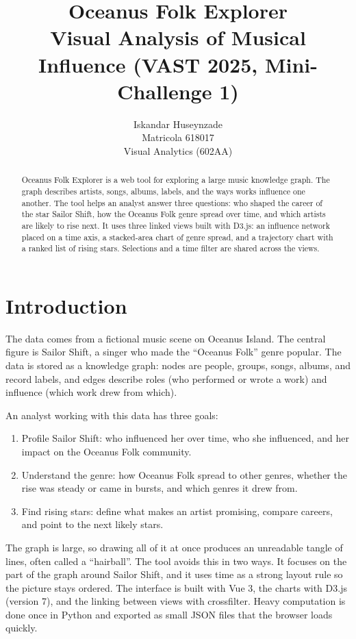 \documentclass[11pt]{article}
\title{\textbf{Oceanus Folk Explorer}\\[2pt]
\large Visual Analysis of Musical Influence (VAST 2025, Mini-Challenge 1)}
\author{Iskandar Huseynzade\\\small Matricola 618017 \\ \small Visual Analytics (602AA)}
\date{}
\begin{document}
\maketitle

\begin{abstract}
\noindent Oceanus Folk Explorer is a web tool for exploring a large music knowledge graph.
The graph describes artists, songs, albums, labels, and the ways works influence one
another. The tool helps an analyst answer three questions: who shaped the career of the
star Sailor Shift, how the Oceanus Folk genre spread over time, and which artists are
likely to rise next. It uses three linked views built with D3.js: an influence network
placed on a time axis, a stacked-area chart of genre spread, and a trajectory chart with
a ranked list of rising stars. Selections and a time filter are shared across the views.
\end{abstract}

\section{Introduction}
The data comes from a fictional music scene on Oceanus Island. The central figure is
Sailor Shift, a singer who made the ``Oceanus Folk'' genre popular. The data is stored as
a knowledge graph: nodes are people, groups, songs, albums, and record labels, and edges
describe roles (who performed or wrote a work) and influence (which work drew from which).

An analyst working with this data has three goals:
\begin{enumerate}[noitemsep]
  \item Profile Sailor Shift: who influenced her over time, who she influenced, and her
        impact on the Oceanus Folk community.
  \item Understand the genre: how Oceanus Folk spread to other genres, whether the rise
        was steady or came in bursts, and which genres it drew from.
  \item Find rising stars: define what makes an artist promising, compare careers, and
        point to the next likely stars.
\end{enumerate}

The graph is large, so drawing all of it at once produces an unreadable tangle of lines,
often called a ``hairball''. The tool avoids this in two ways. It focuses on the part of
the graph around Sailor Shift, and it uses time as a strong layout rule so the picture
stays ordered. The interface is built with Vue 3, the charts with D3.js (version 7), and
the linking between views with crossfilter. Heavy computation is done once in Python and
exported as small JSON files that the browser loads quickly.
\end{document}
